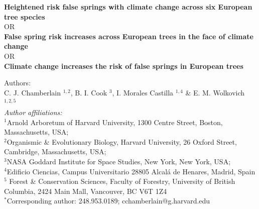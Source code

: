 \documentclass{article}\usepackage[]{graphicx}\usepackage[]{color}
\begin{document}
\noindent \textbf{\Large{Heightened risk false springs with climate change across six European tree species}} \\
OR \\
\textbf{\Large{False spring risk increases across European trees in the face of climate change}} \\
OR \\
\textbf{\Large{Climate change increases the risk of false springs in European trees}}

\noindent Authors:\\
C. J. Chamberlain $^{1,2}$, B. I. Cook $^{3}$, I. Morales Castilla $^{1,4}$ \& E. M. Wolkovich $^{1,2,5}$
\vspace{2ex}\\
\emph{Author affiliations:}\\
$^{1}$Arnold Arboretum of Harvard University, 1300 Centre Street, Boston, Massachusetts, USA; \\
$^{2}$Organismic \& Evolutionary Biology, Harvard University, 26 Oxford Street, Cambridge, Massachusetts, USA; \\
$^{3}$NASA Goddard Institute for Space Studies, New York, New York, USA; \\
$^{4}$Edificio Ciencias, Campus Universitario 28805 Alcal\'{a} de Henares, Madrid, Spain \\
$^{5}$ Forest \& Conservation Sciences, Faculty of Forestry, University of British Columbia, 2424 Main Mall, Vancouver, BC V6T 1Z4\\
\vspace{2ex}
$^*$Corresponding author: 248.953.0189; cchamberlain@g.harvard.edu\\

\renewcommand{\thetable}{\arabic{table}}
\renewcommand{\thefigure}{\arabic{figure}}
\renewcommand{\labelitemi}{$-$}


\end{document}
